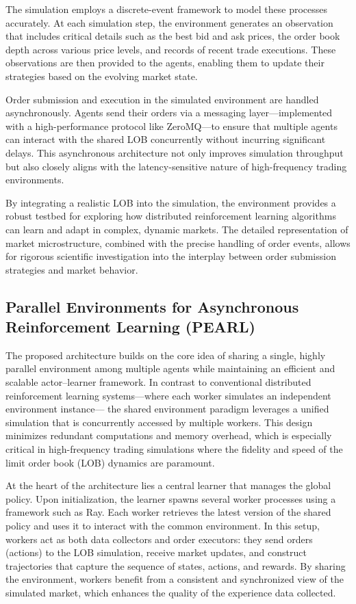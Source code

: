 The simulation employs a discrete-event framework to model these processes accurately.
At each simulation step, the environment generates an observation that includes critical details such as the best bid and ask prices,
the order book depth across various price levels, and records of recent trade executions.
These observations are then provided to the agents, enabling them to update their strategies based on the evolving market state.

Order submission and execution in the simulated environment are handled asynchronously.
Agents send their orders via a messaging layer—implemented with a high-performance protocol like
ZeroMQ—to ensure that multiple agents can interact with the shared LOB concurrently without incurring significant delays.
This asynchronous architecture not only improves simulation throughput but also closely aligns with
the latency-sensitive nature of high-frequency trading environments.

By integrating a realistic LOB into the simulation, the environment provides a robust testbed for exploring how
distributed reinforcement learning algorithms can learn and adapt in complex, dynamic markets.
The detailed representation of market microstructure, combined with the precise handling of order events,
allows for rigorous scientific investigation into the interplay between order submission strategies and market behavior.

\subsection{Parallel Environments for Asynchronous Reinforcement Learning (PEARL)}

The proposed architecture builds on the core idea of sharing a single, highly parallel environment among multiple agents while
maintaining an efficient and scalable actor–learner framework.
In contrast to conventional distributed reinforcement learning systems—where each worker simulates an independent environment instance—
the shared environment paradigm leverages a unified simulation that is concurrently accessed by multiple workers.
This design minimizes redundant computations and memory overhead,
which is especially critical in high-frequency trading simulations where the fidelity and speed of the limit order book (LOB) dynamics are paramount.

At the heart of the architecture lies a central learner that manages the global policy.
Upon initialization, the learner spawns several worker processes using a framework such as Ray.
Each worker retrieves the latest version of the shared policy and uses it to interact with the common environment.
In this setup, workers act as both data collectors and order executors: they send orders (actions) to the LOB simulation,
receive market updates, and construct trajectories that capture the sequence of states, actions, and rewards.
By sharing the environment, workers benefit from a consistent and synchronized view of the simulated market,
which enhances the quality of the experience data collected.

